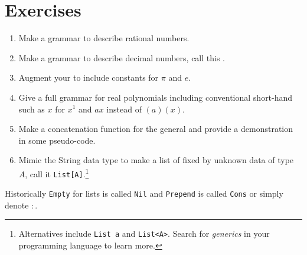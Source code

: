 
\section*{Exercises}

\begin{enumerate}
    \item Make a grammar to describe rational numbers.
    \item Make a grammar to describe decimal numbers, call this .  
    \item Augment your  to include constants for $\pi$ and $e$.
    \item Give a full grammar for real polynomials including conventional short-hand 
    such as $x$ for $x^1$ and $ax$ instead of $(a)(x)$.
    
        
    
    \item Make a concatenation function for the general  and 
    provide a demonstration in some pseudo-code.

    \item Mimic the String data type to make a list of fixed by 
    unknown data of type $A$, call it \lstinline{List[A]}.\footnote{
    Alternatives include \lstinline{List a} and \lstinline{List<A>}. 
    Search for \emph{generics} in your programming language to learn more.
    }

\end{enumerate}
Historically \lstinline{Empty} for lists is called \lstinline{Nil} 
and \lstinline{Prepend} is called \lstinline{Cons} or simply denote $:$.
